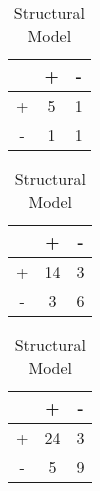 \begin{table}[!htb]
    \begin{subtable}{.33\linewidth}
      \centering
        \begin{tabular}{c|c|c}
            & + & -  \\
            \hline
            + & 5 & 1 \\
            - & 1 & 1 \\
        \end{tabular}
      \caption{Baseline Model}
    \end{subtable}%
    \begin{subtable}{.33\linewidth}
      \centering
        \begin{tabular}{c|c|c}
            & + & -  \\
            \hline
            + & 14 & 3 \\
            - & 3 & 6 \\
        \end{tabular}
      \caption{Eliminative Model}
    \end{subtable}%
        \begin{subtable}{.33\linewidth}
      \centering
        \begin{tabular}{c|c|c}
            & + & -  \\
            \hline
            + & 24 & 3 \\
            - & 5 & 9 \\
        \end{tabular}
      \caption{Structural Model}
    \end{subtable}%
\end{table}